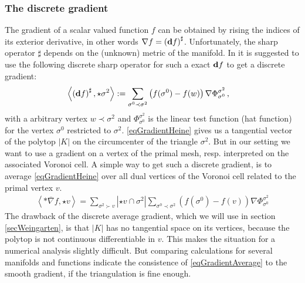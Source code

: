     \subsubsection{The discrete gradient}
      The gradient of a scalar valued function \( f \) can be obtained by rising the indices of its exterior derivative, 
      in other words \( \nabla f = \left( \mathbf{d} f \right)^{\sharp} \).
      Unfortunately, the sharp operator \( \sharp \) depends on the (unknown) metric of the manifold. 
      In \cite{hirani} it is suggested to use the following discrete sharp operator for such a exact  \( \mathbf{d} f \) to get a discrete
      gradient:
      \begin{align}
        \label{eqGradientHeine}
        \left\langle \left( \mathbf{d} f \right)^{\sharp} , \star\sigma^{2}\right\rangle
          &:= \sum_{\sigma^{0}\prec\sigma^{2}} \left( f(\sigma^{0}) - f(w) \right) \nabla\Phi_{\sigma^{0}}^{\sigma^{2}} \,\text{,}
      \end{align}
      with a arbitrary vertex \( w\prec\sigma^{2} \) and 
      \( \Phi_{\sigma^{0}}^{\sigma^{2}} \) is the linear test function (hat function) for the vertex \( \sigma^{0} \) 
      restricted to \( \sigma^{2} \). 
      \eqref{eqGradientHeine} gives us a tangential vector of the polytop \( |K| \) on the circumcenter of the triangle \( \sigma^{2} \).
      But in our setting we want to use a gradient on a vertex of the primal mesh, resp. interpreted on the associated Voronoi cell.
      A simple way to get such a discrete gradient, is to average \eqref{eqGradientHeine} over all dual vertices of the Voronoi cell
      related to the primal vertex \( v \).
      \begin{align} \label{eqGradientAverage}
        \left\langle *\overline\nabla f, \star v \right\rangle
            = \sum_{\sigma^{2}\succ v} \left| \star v \cap \sigma^{2} \right|
                 \sum_{\sigma^{0}\prec\sigma^{2}} \left( f(\sigma^{0}) - f(v) \right) \nabla\Phi_{\sigma^{0}}^{\sigma^{2}}
      \end{align}
      The drawback of the discrete average gradient, which we will use in section \ref{secWeingarten}, is that \( |K| \) has no tangential
      space on its vertices, because the polytop is not continuous differentiable in \( v \).
      This makes the situation for a numerical analysis slightly difficult.
      But comparing calculations for several manifolds and functions indicate the consistence of \eqref{eqGradientAverage} to the smooth
      gradient, 
      if the triangulation is fine enough. 
      



